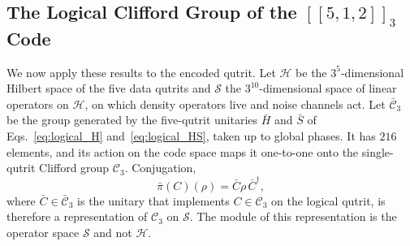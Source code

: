 \subsection{The Logical Clifford Group of the \texorpdfstring{$[[5,1,2]]_3$}{[[5,1,2]]3} Code}
\label{sub:irreps}

We now apply these results to the encoded qutrit. Let $\mathcal{H}$ be the $3^5$-dimensional Hilbert space of the five data qutrits and $\mathcal{S}$ the $3^{10}$-dimensional space of linear operators on $\mathcal{H}$, on which density operators live and noise channels act. Let $\bar{\mathcal{C}}_3$ be the group generated by the five-qutrit unitaries $\bar H$ and $\bar S$ of Eqs.~\eqref{eq:logical_H} and~\eqref{eq:logical_HS}, taken up to global phases. It has $216$ elements, and its action on the code space maps it one-to-one onto the single-qutrit Clifford group $\mathcal{C}_3$. Conjugation,
\begin{equation}
    \bar{\pi}(C)(\rho) = \bar{C} \rho\, \bar{C}^\dagger ,
\end{equation}
where $\bar C \in \bar{\mathcal{C}}_3$ is the unitary that implements $C \in \mathcal{C}_3$ on the logical qutrit, is therefore a representation of $\mathcal{C}_3$ on $\mathcal{S}$. The module of this representation is the operator space $\mathcal{S}$ and not $\mathcal{H}$.

